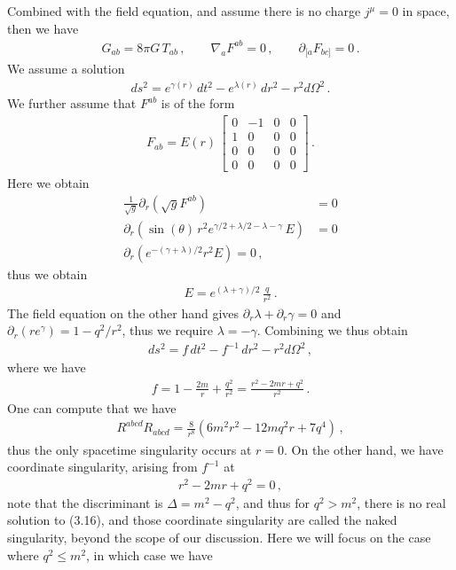 \documentclass[11pt, onesided]{book}
\theoremstyle{break}
\theoremstyle{break}
\newcommand{\pd}{\partial}
\newcommand{\bmat}[1]{\begin{bmatrix} #1 \end{bmatrix}}
\begin{document}
Combined with the field equation, and assume there is no charge $j^\mu = 0$ in space, then we have
\begin{align*}
G_{ab} = 8\pi G\, T_{ab}\,,\qquad
\nabla_a F^{ab} = 0 \,,\qquad
\pd_{[a}F_{bc]} = 0\,.
\end{align*}
We assume a solution
\begin{align*}
ds^2 = e^{\gamma(r)}\, dt^2 - e^{\lambda(r)}\, dr^2 - r^2 d\Omega^2\,.
\end{align*}
We further assume that $F^{ab}$ is of the form
\begin{align*}
F_{ab} = E(r) \, \bmat{0 & -1 & 0 & 0 \\ 1 & 0 & 0 & 0 \\ 0 & 0 & 0 & 0\\ 0 & 0 & 0 &0}\,.
\end{align*}
Here we obtain
\begin{align*}
\frac{1}{\sqrt{g}}\pd_r\left( \sqrt{g} F^{ab}\right) &= 0\\
\pd_r\left( \sin(\theta)\, r^2 e^{\gamma/2 + \lambda/2- \lambda - \gamma}\, E\right) &= 0\\
\pd_r(e^{-(\gamma+\lambda)/2}r^2 E) = 0\,,
\end{align*}
thus we obtain
\begin{align*}
E = e^{(\lambda + \gamma)/2}\,\frac{q}{r^2}\,.
\end{align*}
The field equation on the other hand gives $\pd_r\lambda + \pd_r\gamma = 0$ and $\pd_r(re^{\gamma}) = 1-q^2/r^2$, thus we require $\lambda = -\gamma$. Combining we thus obtain
\begin{align*}
ds^2 = f\, dt^2 - f^{-1}\, dr^2 - r^2 d\Omega^2\,,
\end{align*}
where we have
\begin{align*}
f = 1- \frac{2m}{r} + \frac{q^2}{r^2} = \frac{r^2 - 2mr + q^2}{r^2}  \,.
\end{align*}
One can compute that we have
\begin{align*}
R^{abcd}R_{abcd} = \frac{8}{r^8}\left( 6m^2 r^2 - 12 mq^2 r + 7q^4\right)\,,
\end{align*}
thus the only spacetime singularity occurs at $r = 0$. On the other hand, we have coordinate singularity, arising from $f^{-1}$ at
\begin{align}
r^2 - 2mr + q^2=0\,,
\end{align}
note that the discriminant is $\Delta = m^2 -q^2$, and thus for $q^2 > m^2$, there is no real solution to (3.16), and those coordinate singularity are called the naked singularity, beyond the scope of our discussion. Here we will focus on the case where $q^2 \leq m^2$, in which case we have
\end{document}
